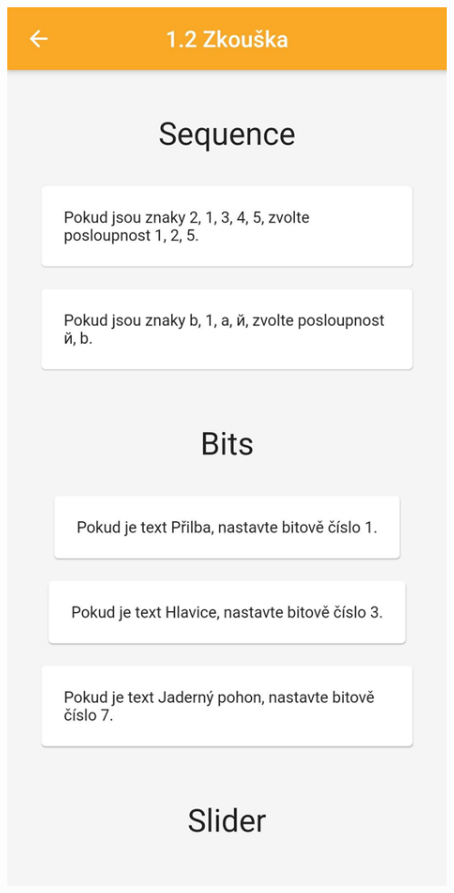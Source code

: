 \documentclass[czech,aspectratio=169]{beamer}
\begin{document}
\begin{frame}
\begin{columns}
\begin{column}{.25\textwidth}
        \begin{center}
          \includegraphics[width=.9\textwidth]{assets/slides/screen-b2}
        \end{center}
      \end{column}
      \begin{column}{.25\textwidth}
        \begin{center}

\end{center}
\end{column}
\end{columns}
\end{frame}
\end{document}
